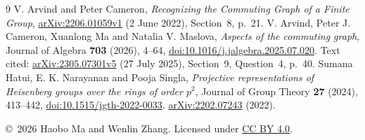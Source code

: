 \documentclass[11pt]{article}
\begin{document}
{\small
\begin{thebibliography}{9}
V. Arvind and Peter Cameron,
\emph{Recognizing the Commuting Graph of a Finite Group},
\href{https://arxiv.org/abs/2206.01059v1}{arXiv:2206.01059v1}
(2 June 2022), Section~8, p.~21.
V. Arvind, Peter J. Cameron, Xuanlong Ma and Natalia V. Maslova,
\emph{Aspects of the commuting graph}, Journal of Algebra
\textbf{703} (2026), 4--64,
\href{https://doi.org/10.1016/j.jalgebra.2025.07.020}{doi:10.1016/j.jalgebra.2025.07.020}.
Text cited: \href{https://arxiv.org/abs/2305.07301v5}{arXiv:2305.07301v5}
(27 July 2025), Section~9, Question~4, p.~40.
Sumana Hatui, E. K. Narayanan and Pooja Singla,
\emph{Projective representations of Heisenberg groups over the rings of
order $p^2$}, Journal of Group Theory \textbf{27} (2024), 413--442,
\href{https://doi.org/10.1515/jgth-2022-0033}{doi:10.1515/jgth-2022-0033}.
\href{https://arxiv.org/abs/2202.07243}{arXiv:2202.07243} (2022).
\end{thebibliography}
}
\medskip\noindent\small
\copyright\ 2026 Haobo Ma and Wenlin Zhang.
Licensed under \href{https://creativecommons.org/licenses/by/4.0/}{CC BY 4.0}.
\end{document}
